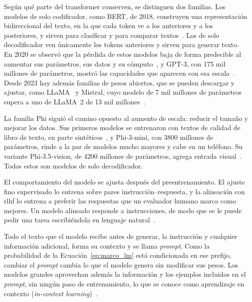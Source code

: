Según qué parte del transformer conserven, se distinguen dos familias. Los modelos de solo codificador,
como BERT, de 2018, construyen una representación bidireccional del texto, en la que cada token ve a los
anteriores y a los posteriores, y sirven para clasificar y para comparar textos~\cite{devlin2019bert}. Los de
solo decodificador ven únicamente los tokens anteriores y sirven para generar texto. En 2020 se observó que la
pérdida de estos modelos baja de forma predecible al aumentar sus parámetros, sus datos y su
cómputo~\cite{kaplan2020scaling}, y GPT-3, con 175 mil millones de parámetros, mostró las capacidades que
aparecen con esa escala~\cite{brown2020language}. Desde 2023 hay además familias de pesos abiertos, que se
pueden descargar y ajustar, como LLaMA~\cite{touvron2023llama} y Mistral, cuyo modelo de 7 mil millones de
parámetros supera a uno de LLaMA~2 de 13 mil millones~\cite{jiang2023mistral}.

La familia Phi siguió el camino opuesto al aumento de escala: reducir el tamaño y mejorar los datos. Sus
primeros modelos se entrenaron con textos de calidad de libro de texto, en parte
sintéticos~\cite{gunasekar2023textbooks}, y Phi-3-mini, con 3800 millones de parámetros, rinde a la par de
modelos mucho mayores y cabe en un teléfono. Su variante Phi-3.5-vision, de 4200 millones de parámetros,
agrega entrada visual~\cite{abdin2024phi3}. Todos estos son modelos de solo decodificador.

El comportamiento del modelo se ajusta después del preentrenamiento. El ajuste fino supervisado lo entrena
sobre pares instrucción--respuesta, y la alineación con \gls{rlhf} lo entrena a preferir las
respuestas que un evaluador humano marca como mejores. Un modelo alineado responde a instrucciones, de modo
que se le puede pedir una tarea escribiéndola en lenguaje natural~\cite{ouyang2022training}.

Todo el texto que el modelo recibe antes de generar, la instrucción y cualquier información adicional,
forma su contexto y se llama \emph{prompt}. Como la probabilidad de la Ecuación~\ref{eq:marco_lm} está
condicionada en ese prefijo, cambiar el \emph{prompt} cambia lo que el modelo genera sin modificar sus
pesos. Los modelos grandes aprovechan además la información y los ejemplos incluidos en el \emph{prompt}, sin
ningún paso de entrenamiento, lo que se conoce como aprendizaje en contexto
(\emph{in-context learning})~\cite{brown2020language}.

